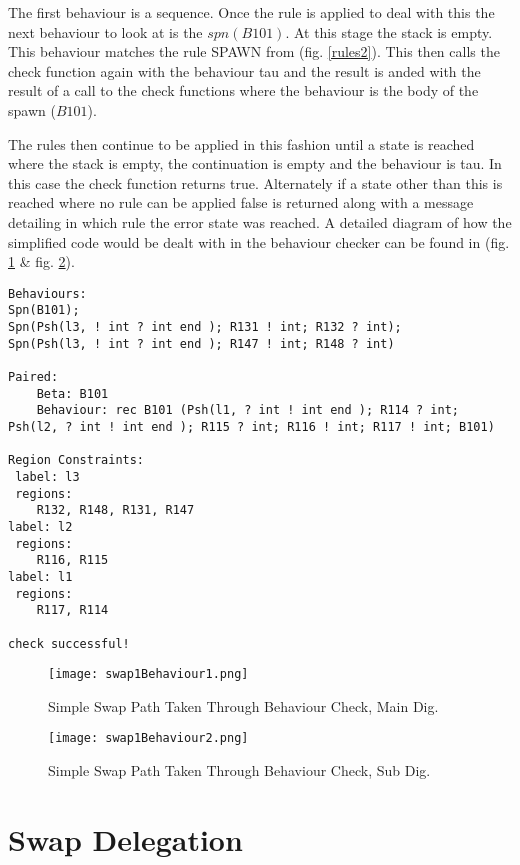 The first behaviour is a sequence. Once the rule is applied to deal with this the next behaviour to look at is the $spn(B101)$. At this stage the stack is empty. This behaviour matches the rule SPAWN from (fig. \ref{rules2}). This then calls the check function again with the behaviour tau and the result is anded with the result of a call to the check functions where the behaviour is the body of the spawn ($B101$). 

The rules then continue to be applied in this fashion until a state is reached where the stack is empty, the continuation is empty and the behaviour is tau. In this case the check function returns true. Alternately if a state other than this is reached where no rule can be applied false is returned along with a message detailing in which rule the error state was reached. A detailed diagram of how the simplified code would be dealt with in the behaviour checker can be found in (fig. \ref{path} \& fig. \ref{path2}).

\begin{lstlisting}
Behaviours:
Spn(B101);
Spn(Psh(l3, ! int ? int end ); R131 ! int; R132 ? int);
Spn(Psh(l3, ! int ? int end ); R147 ! int; R148 ? int)

Paired: 
	Beta: B101 
	Behaviour: rec B101 (Psh(l1, ? int ! int end ); R114 ? int; Psh(l2, ? int ! int end ); R115 ? int; R116 ! int; R117 ! int; B101)

Region Constraints:
 label: l3
 regions:
	R132, R148, R131, R147
label: l2
 regions:
	R116, R115
label: l1
 regions:
	R117, R114

check successful!
\end{lstlisting}

\begin{figure}
\texttt{[image: swap1Behaviour1.png]}
\caption{Simple Swap Path Taken Through Behaviour Check, Main Dig.}
\label{path}
\end{figure}

\begin{figure}
\texttt{[image: swap1Behaviour2.png]}
\caption{Simple Swap Path Taken Through Behaviour Check, Sub Dig.}
\label{path2}
\end{figure}

\FloatBarrier
\section{Swap Delegation}

